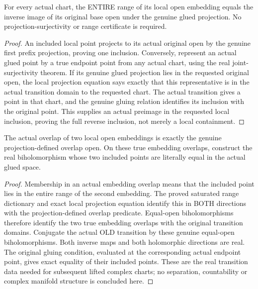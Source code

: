 \begin{theorem}
\label{hir:sharp-actual-endpoint-saturated-local-range}
\leanok
{}
For every actual chart, the ENTIRE range of its local open embedding equals
the inverse image of its original base open under the genuine glued
projection. No projection-surjectivity or range certificate is required.
\end{theorem}
\begin{proof}
An included local point projects to its actual original open by the genuine
first prefix projection, proving one inclusion. Conversely, represent an
actual glued point by a true endpoint point from any actual chart, using
the real joint-surjectivity theorem. If its genuine glued projection lies
in the requested original open, the local projection equation says exactly
that this representative is in the actual transition domain to the
requested chart. The actual transition gives a point in that chart, and
the genuine gluing relation identifies its inclusion with the original
point. This supplies an actual preimage in the requested local inclusion,
proving the full reverse inclusion, not merely a local containment.
\end{proof}

\begin{theorem}
\label{hir:sharp-actual-endpoint-embedding-overlap}
\leanok
{}
The actual overlap of two local open embeddings is exactly the genuine
projection-defined overlap open. On these true embedding overlaps,
construct the real biholomorphism whose two included points are literally
equal in the actual glued space.
\end{theorem}
\begin{proof}
Membership in an actual embedding overlap means that the included point
lies in the entire range of the second embedding. The proved saturated
range dictionary and exact local projection equation identify this in BOTH
directions with the projection-defined overlap predicate. Equal-open
biholomorphisms therefore identify the two true embedding overlaps with
the original transition domains. Conjugate the actual OLD transition by
these genuine equal-open biholomorphisms. Both inverse maps and both
holomorphic directions are real. The original gluing condition, evaluated
at the corresponding actual endpoint point, gives exact equality of their
included points. These are the real transition data needed for subsequent
lifted complex charts; no separation, countability or complex manifold
structure is concluded here.
\end{proof}
